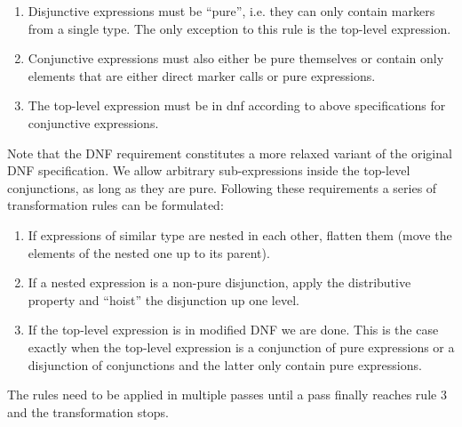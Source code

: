 \documentclass[11pt,a4paper]{report}
\begin{document}
\begin{enumerate}
	\item Disjunctive expressions must be ``pure'', i.e. they can only contain markers from a single type. The only exception to this rule is the top-level expression.
	\item Conjunctive expressions must also either be pure themselves or contain only elements that are either direct marker calls or pure expressions.
	\item The top-level expression must be in \ac{dnf} according to above specifications for conjunctive expressions.
\end{enumerate}

Note that the DNF requirement constitutes a more relaxed variant of the original DNF specification.
We allow arbitrary sub-expressions inside the top-level conjunctions, as long as they are pure.
Following these requirements a series of transformation rules can be formulated:

\begin{enumerate}
	\item If expressions of similar type are nested in each other, flatten them (move the elements of the nested one up to its parent).
	\item If a nested expression is a non-pure disjunction, apply the distributive property and ``hoist'' the disjunction up one level.
	\item If the top-level expression is in modified DNF we are done. This is the case exactly when the top-level expression is a conjunction of pure expressions or a disjunction of conjunctions and the latter only contain pure expressions.
\end{enumerate}

The rules need to be applied in multiple passes until a pass finally reaches rule 3 and the transformation stops.


\begin{appendices}

\end{appendices}
\end{document}
